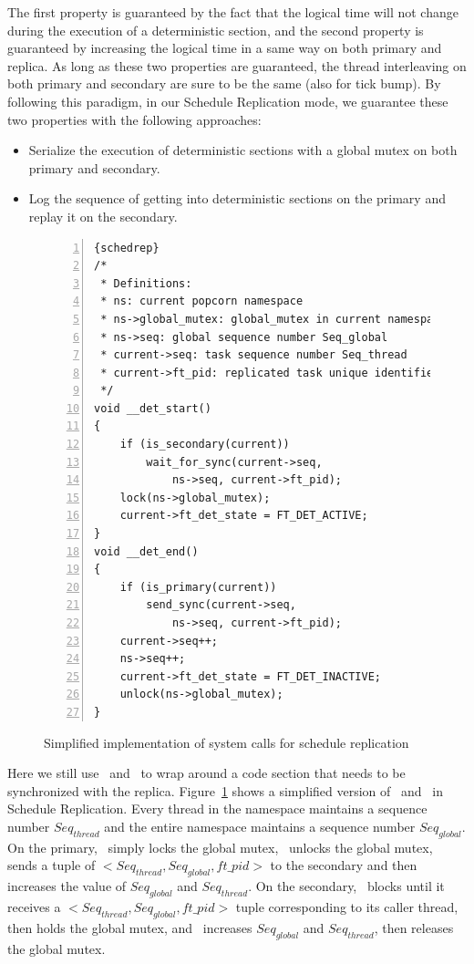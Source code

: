 The first property is guaranteed by the fact that the logical time will not change during the execution of a deterministic section, and the second property is guaranteed by increasing the logical time in a same way on both primary and replica. As long as these two properties are guaranteed, the thread interleaving on both primary and secondary are sure to be the same (also for tick bump). By following this paradigm, in our Schedule Replication mode, we guarantee these two properties with the following approaches:

\begin{itemize}
\item Serialize the execution of deterministic sections with a global mutex on both primary and secondary.
\item Log the sequence of getting into deterministic sections on the primary and replay it on the secondary.
\end{itemize}

\begin{figure}
\begin{lstlisting}[numbers=left, frame=single, basicstyle=\small, breaklines]{schedrep}
/*
 * Definitions:
 * ns: current popcorn namespace
 * ns->global_mutex: global_mutex in current namespace
 * ns->seq: global sequence number Seq_global
 * current->seq: task sequence number Seq_thread
 * current->ft_pid: replicated task unique identifier
 */
void __det_start()
{
    if (is_secondary(current))
        wait_for_sync(current->seq, 
            ns->seq, current->ft_pid);
    lock(ns->global_mutex);
    current->ft_det_state = FT_DET_ACTIVE;
}
void __det_end()
{
    if (is_primary(current))
        send_sync(current->seq, 
            ns->seq, current->ft_pid);
    current->seq++;
    ns->seq++;
    current->ft_det_state = FT_DET_INACTIVE;
    unlock(ns->global_mutex);
}
\end{lstlisting}
\caption{Simplified implementation of system calls for schedule replication}
\label{f:schedrep_c}
\end{figure}


Here we still use \detstart\ and \detend\ to wrap around a code section that needs to be synchronized with the replica. Figure~\ref{f:schedrep_c} shows a simplified version of \detstart\ and \detend\ in Schedule Replication.  Every thread in the namespace maintains a sequence number $Seq_{thread}$ and the entire namespace maintains a sequence number $Seq_{global}$. On the primary, \detstart\ simply locks the global mutex, \detend\ unlocks the global mutex, sends a tuple of $< Seq_{thread}, Seq_{global}, ft\_pid >$ to the secondary and then increases the value of $Seq_{global}$ and $Seq_{thread}$. On the secondary, \detstart\ blocks until it receives a $< Seq_{thread}, Seq_{global}, ft\_pid >$ tuple corresponding to its caller thread, then holds the global mutex, and \detend\ increases $Seq_{global}$ and $Seq_{thread}$, then releases the global mutex.

